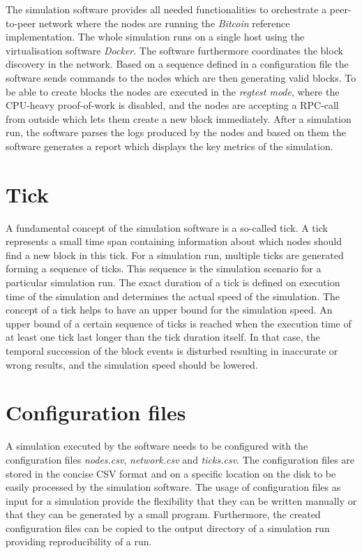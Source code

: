 The simulation software provides all needed functionalities to orchestrate a peer-to-peer network where the nodes are running the \textit{Bitcoin} reference implementation.
The whole simulation runs on a single host using the virtualisation software \textit{Docker}.
The software furthermore coordinates the block discovery in the network.
Based on a sequence defined in a configuration file the software sends commands to the nodes which are then generating valid blocks.
To be able to create blocks the nodes are executed in the \textit{regtest mode}, where the CPU-heavy proof-of-work is disabled, and the nodes are accepting a RPC-call from outside which lets them create a new block immediately.
After a simulation run, the software parses the logs produced by the nodes and based on them the software generates a report which displays the key metrics of the simulation.
  
\section{Tick}
A fundamental concept of the simulation software is a so-called tick.
A tick represents a small time span containing information about which nodes should find a new block in this tick.
For a simulation run, multiple ticks are generated forming a sequence of ticks.
This sequence is the simulation scenario for a particular simulation run.
The exact duration of a tick is defined on execution time of the simulation and determines the actual speed of the simulation.
The concept of a tick helps to have an upper bound for the simulation speed.
An upper bound of a certain sequence of ticks is reached when the execution time of at least one tick last longer than the tick duration itself.
In that case, the temporal succession of the block events is disturbed resulting in inaccurate or wrong results, and the simulation speed should be lowered.

\section{Configuration files}

A simulation executed by the software needs to be configured with the configuration files \textit{nodes.csv}, \textit{network.csv} and \textit{ticks.csv}.
The configuration files are stored in the concise CSV format and on a specific location on the disk to be easily processed by the simulation software.
The usage of configuration files as input for a simulation provide the flexibility that they can be written manually or that they can be generated by a small program.
Furthermore, the created configuration files can be copied to the output directory of a simulation run providing reproducibility of a run.

